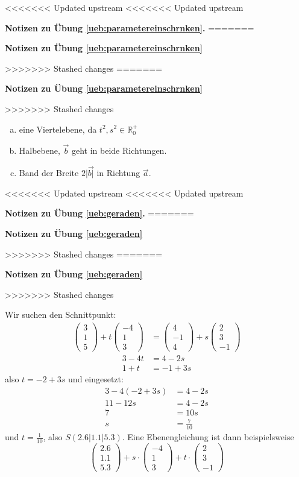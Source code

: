 \documentclass[%
11pt,%
twoside,%
titlepage,%
<<<<<<< Updated upstream
<<<<<<< Updated upstream
german,%
=======
swissgerman,%
>>>>>>> Stashed changes
=======
swissgerman,%
>>>>>>> Stashed changes
headsepline%
]{scrartcl}
\newcommand{\faReturnGray}{\textcolor{gray}{\faMailReply}} %
\newcommand{\faReturnGray}{\textcolor{gray}{\faMailReply}} %
\theoremstyle{definition}
\theoremstyle{plain}
\newcommand{\concatueb}[1]{ueb:#1}%
\newcommand{\concatlsg}[1]{lsg:#1}%
\newenvironment{lsg}[1]{%
<<<<<<< Updated upstream
<<<<<<< Updated upstream
    \par\noindent\textbf{Notizen zu Übung \ref{\concatueb{#1}}.}%
    \label{\concatlsg{#1}}
=======
    \par\noindent\textbf{Notizen zu Übung \ref{\concatueb{#1}}}\label{\concatlsg{#1}}
    \hfill\hyperref[\concatueb{#1}]{\faReturnGray}\par %
>>>>>>> Stashed changes
=======
    \par\noindent\textbf{Notizen zu Übung \ref{\concatueb{#1}}}\label{\concatlsg{#1}}
    \hfill\hyperref[\concatueb{#1}]{\faReturnGray}\par %
>>>>>>> Stashed changes
}{%
    \par%
}
\begin{document}
\begin{lsg}{parametereinschrnken}
\begin{enumerate}[a)]
    \item eine Viertelebene, da $t^2,s^2\in\mathbb{R}_0^+$
    \item Halbebene, $\vec{b}$ geht in beide Richtungen.
    \item Band der Breite $2|\vec{b|}$ in Richtung $\vec{a}$.
\end{enumerate}
\end{lsg}
\begin{lsg}{geraden}
Wir suchen den Schnittpunkt:
\begin{align*}
    \begin{pmatrix}3\\1\\5\end{pmatrix}+t\begin{pmatrix}-4\\1\\3\end{pmatrix} &= \begin{pmatrix}4\\-1\\4\end{pmatrix}+s\begin{pmatrix}2\\3\\-1\end{pmatrix}
\end{align*}
\begin{align*}
    3-4t &= 4-2s\\
    1+t &= -1+3s
\end{align*}
also $t=-2+3s$ und eingesetzt:
\begin{align*}
    3-4(-2+3s) &= 4-2s\\
    11-12s &= 4-2s\\
    7 &= 10s\\
    s &= \frac{7}{10}
\end{align*}
und $t=\frac{1}{10}$, also $S(2.6|1.1|5.3)$. Eine Ebenengleichung ist dann beispielsweise
$$\begin{pmatrix}
    2.6\\1.1\\5.3
\end{pmatrix}+s\cdot\begin{pmatrix}
    -4\\1\\3
\end{pmatrix}+t\cdot\begin{pmatrix}
    2\\3\\-1
\end{pmatrix}$$
\end{lsg}
\end{document}
